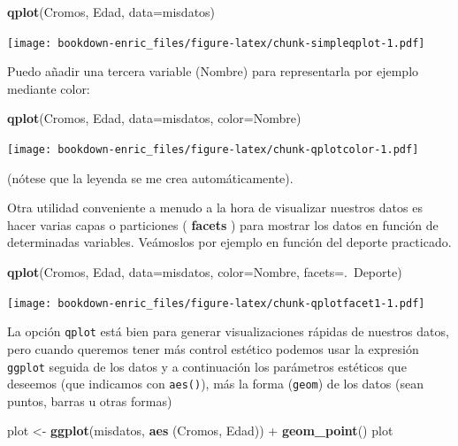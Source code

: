 \documentclass[]{book}
\newenvironment{Shaded}{\begin{snugshade}}{\end{snugshade}}
\newcommand{\KeywordTok}[1]{\textcolor[rgb]{0.13,0.29,0.53}{\textbf{{#1}}}}
\newcommand{\DataTypeTok}[1]{\textcolor[rgb]{0.13,0.29,0.53}{{#1}}}
\newcommand{\StringTok}[1]{\textcolor[rgb]{0.31,0.60,0.02}{{#1}}}
\newcommand{\NormalTok}[1]{{#1}}
\theoremstyle{definition}
\theoremstyle{definition}
\theoremstyle{remark}
\begin{document}
\begin{Shaded}
\begin{Highlighting}[]
\KeywordTok{qplot}\NormalTok{(Cromos, Edad, }\DataTypeTok{data=}\NormalTok{misdatos)}
\end{Highlighting}
\end{Shaded}

\texttt{[image: bookdown-enric\_files/figure-latex/chunk-simpleqplot-1.pdf]}

Puedo añadir una tercera variable (Nombre) para representarla por
ejemplo mediante color:

\begin{Shaded}
\begin{Highlighting}[]
\KeywordTok{qplot}\NormalTok{(Cromos, Edad, }\DataTypeTok{data=}\NormalTok{misdatos, }\DataTypeTok{color=}\NormalTok{Nombre)}
\end{Highlighting}
\end{Shaded}

\texttt{[image: bookdown-enric\_files/figure-latex/chunk-qplotcolor-1.pdf]}

(nótese que la leyenda se me crea automáticamente).

Otra utilidad conveniente a menudo a la hora de visualizar nuestros
datos es hacer varias capas o particiones ( \textbf{facets} ) para
mostrar los datos en función de determinadas variables. Veámoslos por
ejemplo en función del deporte practicado.

\begin{Shaded}
\begin{Highlighting}[]
\KeywordTok{qplot}\NormalTok{(Cromos, Edad, }\DataTypeTok{data=}\NormalTok{misdatos, }\DataTypeTok{color=}\NormalTok{Nombre, }\DataTypeTok{facets=}\NormalTok{.~Deporte)}
\end{Highlighting}
\end{Shaded}

\texttt{[image: bookdown-enric\_files/figure-latex/chunk-qplotfacet1-1.pdf]}

La opción \texttt{qplot} está bien para generar visualizaciones rápidas
de nuestros datos, pero cuando queremos tener más control estético
podemos usar la expresión \texttt{ggplot} seguida de los datos y a
continuación los parámetros estéticos que deseemos (que indicamos con
\texttt{aes()}), más la forma (\texttt{geom}) de los datos (sean puntos,
barras u otras formas)

\begin{Shaded}
\begin{Highlighting}[]
\NormalTok{plot <-}\StringTok{ }\KeywordTok{ggplot}\NormalTok{(misdatos, }\KeywordTok{aes} \NormalTok{(Cromos, Edad)) +}\StringTok{ }\KeywordTok{geom_point}\NormalTok{()}
\NormalTok{plot}
\end{Highlighting}
\end{Shaded}
\end{document}
